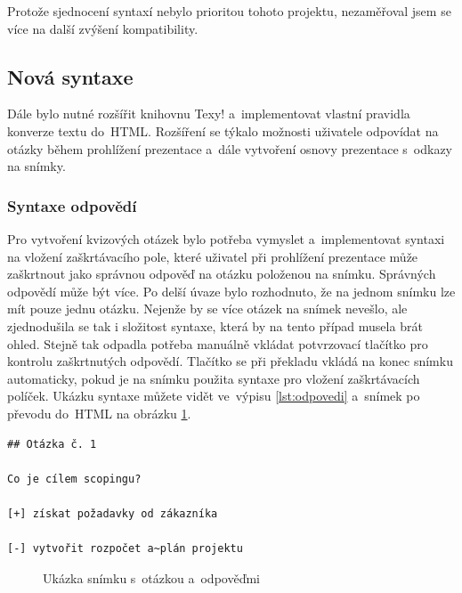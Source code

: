 \documentclass[11pt,twoside,a4paper]{book}
\begin{document}
Protože sjednocení syntaxí nebylo prioritou tohoto projektu, nezaměřoval jsem se více na další zvýšení kompatibility.


\subsection{Nová syntaxe}
Dále bylo nutné rozšířit knihovnu Texy! a~imple\-mentovat vlastní pravidla konverze textu do~HTML. Rozšíření se týkalo možnosti uživatele odpovídat na otázky během prohlížení prezentace a~dále vytvoření osnovy prezentace s~odkazy na snímky.

\subsubsection{Syntaxe odpovědí}
Pro vytvoření kvizových otázek bylo potřeba vymyslet a~imple\-mentovat syntaxi na vložení zaškrtávacího pole, které uživatel při prohlížení prezentace může zaškrtnout jako správnou odpověď na otázku položenou na snímku. Správných odpovědí může být více. Po delší úvaze bylo rozhodnuto, že na jednom snímku lze mít pouze jednu otázku. Nejenže by se více otázek na snímek nevešlo, ale zjednodušila se tak i složitost syntaxe, která by na tento případ musela brát ohled. Stejně tak odpadla potřeba manuálně vkládat potvrzovací tlačítko pro kontrolu zaškrtnutých odpovědí. Tlačítko se při překladu vkládá na konec snímku automaticky, pokud je na snímku použita syntaxe pro vložení zaškrtávacích políček. Ukázku syntaxe můžete vidět ve~výpisu \ref{lst:odpovedi} a~snímek po převodu do~HTML na obrázku \ref{fig:odpovedi}.

\begin{lstlisting}[caption={Ukázka zdrojového textu snímku s~otázkou a~odpovědmi},label={lst:odpovedi},captionpos=b]
## Otázka č. 1

Co je cílem scopingu?

[+] získat požadavky od zákazníka

[-] vytvořit rozpočet a~plán projektu
\end{lstlisting}


\begin{figure}[ht]
	\begin{center}
		\caption{Ukázka snímku s~otázkou a~odpověďmi}
		\label{fig:odpovedi}
	\end{center}
\end{figure}
\end{document}
